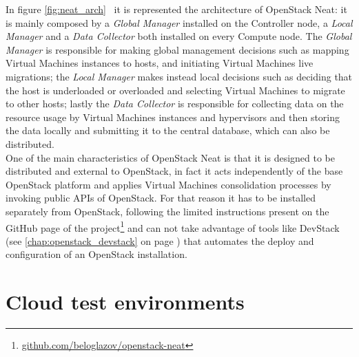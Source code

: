 In figure \ref{fig:neat_arch}~\cite[p.~7]{beloglazov2014openstack} it is represented the architecture of OpenStack Neat: it is mainly composed by a \textit{Global Manager} installed on the Controller node, a \textit{Local Manager}  and a \textit{Data Collector} both installed on every Compute node. The \textit{Global Manager} is responsible for making global management decisions such as mapping Virtual Machines instances to hosts, and initiating Virtual Machines live migrations; the \textit{Local Manager} makes instead local decisions such as deciding that the host is underloaded or overloaded and selecting Virtual Machines to migrate to other hosts; lastly the \textit{Data Collector}  is responsible for collecting data on the resource usage by Virtual Machines instances and hypervisors and then storing the data locally and submitting it to the central database, which can also be distributed.\\
One of the main characteristics of OpenStack Neat is that it is designed to be distributed and external to OpenStack, in fact it acts independently of the base OpenStack platform and applies Virtual Machines consolidation processes by invoking public APIs of OpenStack. For that reason it has to be installed separately from OpenStack, following the limited instructions present on the GitHub page of the project\footnote{\url{github.com/beloglazov/openstack-neat}} and can not take advantage of tools like DevStack (see \ref{chap:openstack_devstack} on page \pageref{chap:openstack_devstack}) that automates the deploy and configuration of an OpenStack installation. \\



\section{Cloud test environments}
\label{sec:sota_test_env}

